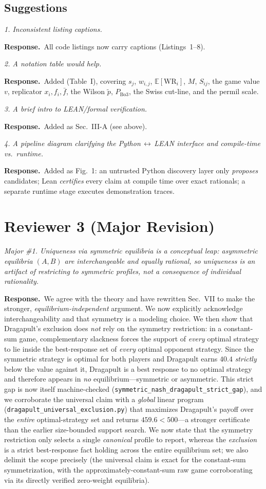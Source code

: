 \documentclass[11pt]{article}
\newcommand{\cmt}[1]{\par\smallskip\noindent\textit{#1}\par\smallskip}
\newcommand{\resp}{\par\noindent\textbf{Response.}\ }
\begin{document}
\subsection*{Suggestions}
\cmt{1. Inconsistent listing captions.}
\resp All code listings now carry captions (Listings~1--8).
\cmt{2. A notation table would help.}
\resp Added (Table~I), covering $s_j$, $w_{i,j}$, $\mathbb{E}[\mathrm{WR}_i]$, $M$,
$S_{ij}$, the game value $v$, replicator $x_i,f_i,\bar f$, the Wilson $\tilde p$,
$P_{\mathrm{Bo3}}$, the Swiss cut-line, and the permil scale.
\cmt{3. A brief intro to LEAN/formal verification.}
\resp Added as Sec.~III-A (see above).
\cmt{4. A pipeline diagram clarifying the Python\,$\leftrightarrow$\,LEAN interface
and compile-time vs.\ runtime.}
\resp Added as Fig.~1: an untrusted Python discovery layer only \emph{proposes}
candidates; Lean \emph{certifies} every claim at compile time over exact
rationals; a separate runtime stage executes demonstration traces.

\hrulefill

\section*{Reviewer 3 (Major Revision)}

\cmt{Major \#1. Uniqueness via symmetric equilibria is a conceptual leap:
asymmetric equilibria $(A,B)$ are interchangeable and equally rational, so
uniqueness is an artifact of restricting to symmetric profiles, not a consequence
of individual rationality.}
\resp We agree with the theory and have rewritten Sec.~VII to make the stronger,
\emph{equilibrium-independent} argument. We now explicitly acknowledge
interchangeability and that symmetry is a modeling choice. We then show that
Dragapult's exclusion does \emph{not} rely on the symmetry restriction: in a
constant-sum game, complementary slackness forces the support of \emph{every}
optimal strategy to lie inside the best-response set of \emph{every} optimal
opponent strategy. Since the symmetric strategy is optimal for both players and
Dragapult earns $40.4$\textperthousand{} \emph{strictly} below the value against
it, Dragapult is a best response to no optimal strategy and therefore appears in
\emph{no} equilibrium---symmetric or asymmetric. This strict gap is now itself
machine-checked (\texttt{symmetric\_nash\_dragapult\_strict\_gap}), and we
corroborate the universal claim with a \emph{global} linear program
(\texttt{dragapult\_universal\_exclusion.py}) that maximizes Dragapult's payoff over
the \emph{entire} optimal-strategy set and returns $459.6<500$---a stronger
certificate than the earlier size-bounded support search. We now state that the
symmetry restriction only selects a single \emph{canonical} profile to report,
whereas the \emph{exclusion} is a strict best-response fact holding across the
entire equilibrium set; we also delimit the scope precisely (the universal claim is
exact for the constant-sum symmetrization, with the approximately-constant-sum raw
game corroborating via its directly verified zero-weight equilibria).
\end{document}
